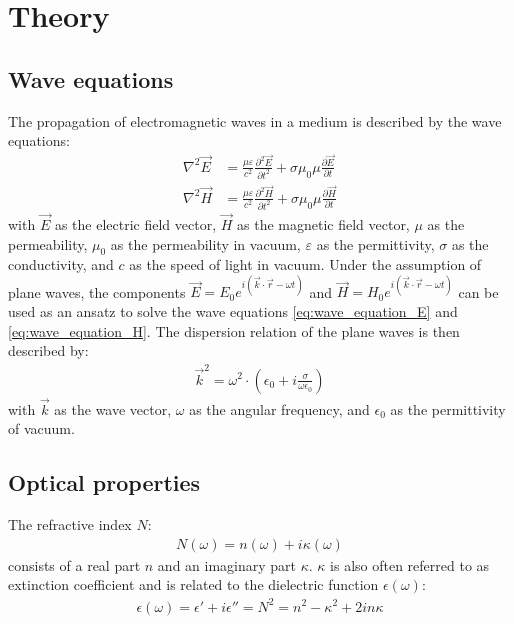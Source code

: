 \nopagebreak
\section{Theory}

\subsection{Wave equations}

The propagation of electromagnetic waves in a medium is described by the wave equations:
\begin{align}
    \nabla^2 \vec{E} &= \frac{\mu \varepsilon}{c^2} \frac{\partial^2 \vec{E}}{\partial t^2} + \sigma \mu_0 \mu \frac{\partial \vec{E}}{\partial t} \label{eq:wave_equation_E} \\
    \nabla^2 \vec{H} &= \frac{\mu \varepsilon}{c^2} \frac{\partial^2 \vec{H}}{\partial t^2} + \sigma \mu_0 \mu \frac{\partial \vec{H}}{\partial t} \label{eq:wave_equation_H}
\end{align}
with $\vec{E}$ as the electric field vector, $\vec{H}$ as the magnetic field vector, 
$\mu$ as the permeability, $\mu_0$ as the permeability in vacuum, $\varepsilon$ as the permittivity, $\sigma$ as the conductivity, 
and $c$ as the speed of light in vacuum.
Under the assumption of plane waves, the components $\vec{E} = E_0 e^{i(\vec{k}\cdot\vec{r}-\omega t)}$ 
and $\vec{H} = H_0 e^{i(\vec{k}\cdot\vec{r}-\omega t)}$ can be used as an ansatz to solve the wave equations \ref{eq:wave_equation_E} and \ref{eq:wave_equation_H}. 
The dispersion relation of the plane waves is then described by:
\begin{align}
    \vec{k}^2 = \omega^2\cdot(\epsilon_0 + i\frac{\sigma}{\omega\epsilon_0}) \label{eq:dispersion_relation}
\end{align}
with $\vec{k}$ as the wave vector, $\omega$ as the angular frequency, and $\epsilon_0$ as the permittivity of vacuum.

\subsection{Optical properties}
The refractive index $N$:
\begin{align}
    N(\omega) = n(\omega) + i\kappa(\omega) \label{eq:refractive_index}
\end{align}
consists of a real part $n$ and an imaginary part $\kappa$. $\kappa$ is also often referred to as extinction coefficient 
and is related to the dielectric function $\epsilon(\omega)$:
\begin{align}
    \epsilon(\omega) = \epsilon'+i\epsilon'' = N^2 = n^2 - \kappa^2 + 2i n \kappa \label{eq:epsilon}
\end{align}

